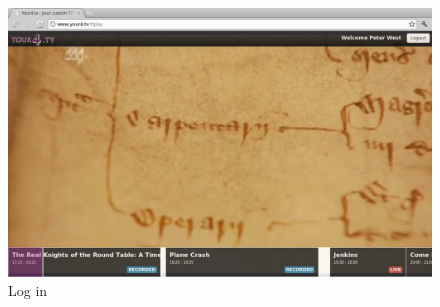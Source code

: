 \begin{figure}[th]
	\centering
	\includegraphics[width=\textwidth]{images/screenshots/your4-play.png}
	\caption{Log in}
	\label{fig:your4-play}
\end{figure}

